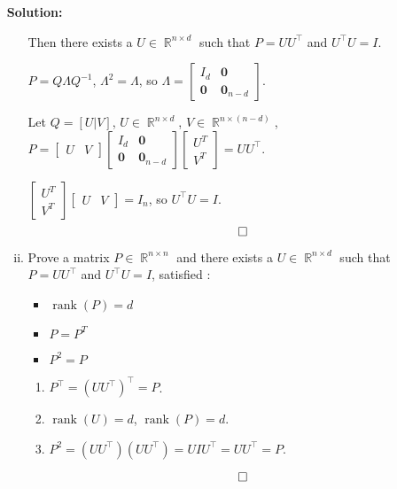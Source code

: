 \documentclass{article}
\DeclareMathOperator{\rank}{\mathrm{rank}}
\DeclareMathOperator{\R}{\mathbb{R}}
\newenvironment{solution}{\color{blue} \smallskip \textbf{Solution:}}{}
\begin{document}
\begin{enumerate}[(a)]
\begin{solution}
\begin{enumerate}[(i)]
            Then there exists a $U \in \R^{n \times d}$ such that $P = UU^\top$ and $U^{\top}U = I$.

            $P = Q\Lambda Q^{-1}$, $\Lambda^2 = \Lambda$, so $\Lambda = \begin{bmatrix} I_d & \mathbf{0} \\ \mathbf{0} & \mathbf{0}_{n-d} \end{bmatrix}$.

            Let $Q = [U | V]$, $U \in \R^{n \times d}$, $V \in \R^{n \times (n - d)}$, 
            $P = \begin{bmatrix} U & V \end{bmatrix}
            \begin{bmatrix} I_d & \mathbf{0} \\ \mathbf{0} & \mathbf{0}_{n-d} \end{bmatrix}
            \begin{bmatrix} U^T \\ V^T \end{bmatrix} = UU^\top$.

            $\begin{bmatrix} U^T \\ V^T \end{bmatrix} \begin{bmatrix} U & V \end{bmatrix} = I_n$, so $U^\top U = I$.
            \[ \qedhere \]

            \item Prove a matrix $P \in \R^{n \times n}$ and there exists a $U \in \R^{n \times d}$ such that $P = UU^\top$ and $U^{\top}U = I$, satisfied : 
            \begin{itemize}
                \item $\rank(P) = d$
                \item $P = P^{T}$
                \item $P^{2} = P$
            \end{itemize}
            \begin{enumerate}[(1)]
                \item $P^\top = (UU^\top)^\top = P$.
                \item $\rank(U) = d$, $\rank(P) = d$.
                \item $P^2 = (UU^\top)(UU^\top) = UIU^\top = UU^\top = P$.
            \end{enumerate}
            \[ \qedhere \]

        \end{enumerate}
    \end{solution}


\end{enumerate}
\end{document}
